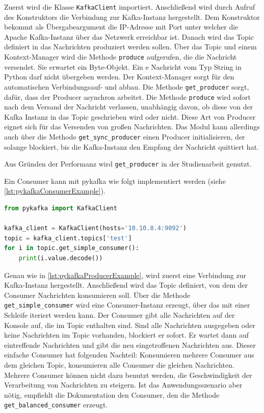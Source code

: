 \documentclass[a4paper,titlepage,halfparskip,12pt]{scrreprt}
\begin{document}
\begin{onehalfspacing}
Zuerst wird die Klasse \texttt{KafkaClient} importiert. Anschließend wird durch Aufruf des Konstruktors die Verbindung zur Kafka-Instanz hergestellt. Dem Konstruktor bekommt als Übergabeargument die IP-Adresse mit Port unter welcher die Apache Kafka-Instanz über das Netzwerk erreichbar ist. Danach wird das Topic definiert in das Nachrichten produziert werden sollen. Über das Topic und einem Kontext-Manager wird die Methode \texttt{produce} aufgerufen, die die Nachricht versendet. Sie erwartet ein Byte-Objekt. Ein e Nachricht vom Typ String in Python darf nicht übergeben werden.  Der Kontext-Manager sorgt für den automatischen Verbindungsauf- und abbau. Die Methode \texttt{get\_producer} sorgt, dafür, dass der Producer asynchron arbeitet. Die Methode \texttt{produce} wird sofort nach dem Versand der Nachricht verlassen, unabhängig davon, ob diese von der Kafka Instanz in das Topic geschrieben wird oder nicht. Diese Art von Producer eignet sich für das Versenden von großen Nachrichten. Das Modul kann allerdings auch über die Methode \texttt{get\_sync\_producer} einen Producer initialisieren, der solange blockiert, bis die Kafka-Instanz den Empfang der Nachricht quittiert hat.

Aus Gründen der Performanz wird \texttt{get\_producer} in der Studienarbeit genutzt.

Ein Consumer kann mit pykafka wie folgt implementiert werden (siehe \autoref{lst:pykafkaConsumerExample}).

\begin{lstlisting}[language=python, caption={Beispiel: Verwendung des Consumers des Moduls pykafka}, label={lst:pykafkaConsumerExample}]
from pykafka import KafkaClient

kafka_client = KafkaClient(hosts='10.10.8.4:9092')
topic = kafka_client.topics['test']
for i in topic.get_simple_consumer():
    print(i.value.decode())
\end{lstlisting}

Genau wie in \autoref{lst:pykafkaProducerExample}, wird zuerst eine Verbindung zur Kafka-Instanz hergestellt. Anschließend wird das Topic definiert, von dem der Consumer Nachrichten konsumieren soll. Über die Methode \texttt{get\_simple\_consumer} wird eine Consumer-Instanz erzeugt, über das mit einer Schleife iteriert werden kann. Der Consumer gibt alle Nachrichten auf der Konsole auf, die im Topic enthalten sind. Sind alle Nachrichten ausgegeben oder keine Nachrichten im Topic vorhanden, blockiert er sofort. Er wartet dann auf eintreffende Nachrichten und gibt die neu eingetroffenen Nachrichten aus. Dieser einfache Consumer hat folgenden Nachteil: Konsumieren mehrere Consumer aus dem gleichen Topic, konsumieren alle Consumer die gleichen Nachrichten. Mehrere Consumer können nicht dazu benutzt werden, die Geschwindigkeit der Verarbeitung von Nachrichten zu steigern. Ist das Anwendungsszenario aber nötig, empfiehlt die Dokumentation den Consumer, den die Methode \texttt{get\_balanced\_consumer} erzeugt.


\end{onehalfspacing}
\end{document}

